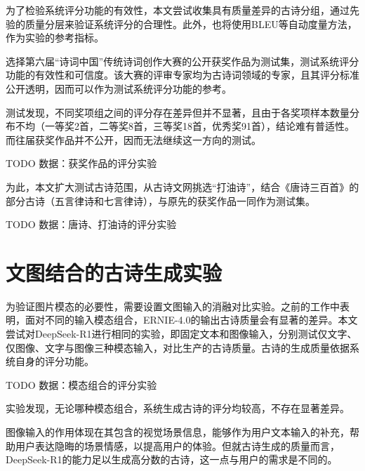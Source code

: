 为了检验系统评分功能的有效性，本文尝试收集具有质量差异的古诗分组，通过先验的质量分层来验证系统评分的合理性。此外，也将使用BLEU等自动度量方法，作为实验的参考指标。

选择第六届“诗词中国”传统诗词创作大赛的公开获奖作品为测试集，测试系统评分功能的有效性和可信度。该大赛的评审专家均为古诗词领域的专家，且其评分标准公开透明，因而可以作为测试系统评分功能的参考。

测试发现，不同奖项组之间的评分存在差异但并不显著，且由于各奖项样本数量分布不均（一等奖2首，二等奖8首，三等奖18首，优秀奖91首），结论难有普适性。 而往届获奖作品并不公开，因而无法继续这一方向的测试。

TODO 数据：获奖作品的评分实验


为此，本文扩大测试古诗范围，从古诗文网挑选“打油诗”，结合《唐诗三百首》的部分古诗（五言律诗和七言律诗），与原先的获奖作品一同作为测试集。

TODO 数据：唐诗、打油诗的评分实验

\section{文图结合的古诗生成实验}

为验证图片模态的必要性，需要设置文图输入的消融对比实验。之前的工作中表明，面对不同的输入模态组合，ERNIE-4.0的输出古诗质量会有显著的差异。本文尝试对DeepSeek-R1进行相同的实验，即固定文本和图像输入，分别测试仅文字、仅图像、文字与图像三种模态输入，对比生产的古诗质量。古诗的生成质量依据系统自身的评分功能。

TODO 数据：模态组合的评分实验

实验发现，无论哪种模态组合，系统生成古诗的评分均较高，不存在显著差异。

图像输入的作用体现在其包含的视觉场景信息，能够作为用户文本输入的补充，帮助用户表达隐晦的场景情感，以提高用户的体验。但就古诗生成的质量而言，DeepSeek-R1的能力足以生成高分数的古诗，这一点与用户的需求是不同的。